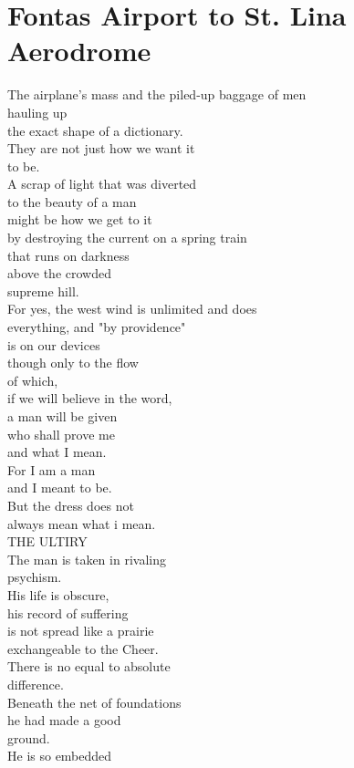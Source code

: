 \documentclass[smalldemyvopaper,11pt,twoside,onecolumn,openright,extrafontsizes]{memoir}
\begin{document}
\chapter{Fontas Airport to St. Lina Aerodrome}
The airplane's mass and the piled-up baggage of men
\\hauling up
\\the exact shape of a dictionary.
\\They are not just how we want it
\\to be.
\\A scrap of light that was diverted
\\to the beauty of a man
\\might be how we get to it
\\by destroying the current on a spring train
\\that runs on darkness
\\above the crowded
\\supreme hill.
\\For yes, the west wind is unlimited and does
\\everything, and "by providence"
\\is on our devices
\\though only to the flow
\\of which,
\\if we will believe in the word,
\\a man will be given
\\who shall prove me
\\and what I mean.
\\For I am a man
\\and I meant to be.
\\But the dress does not
\\always mean what i mean.
\\THE ULTIRY
\\The man is taken in rivaling
\\psychism.
\\His life is obscure,
\\his record of suffering
\\is not spread like a prairie
\\exchangeable to the Cheer.
\\There is no equal to absolute
\\difference.
\\Beneath the net of foundations
\\he had made a good
\\ground.
\\He is so embedded
\end{document}
